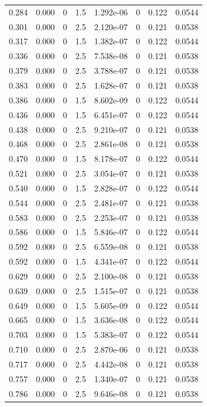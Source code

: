 \documentclass[preview]{standalone}
\begin{document}
{{\begin{tabular}{L{1.2cm}C{1.2cm} C{0.3cm}C{0.5cm} C{1.4cm}C{1.4cm} C{1.4cm}C{1.4cm}}
  0.284  &  0.000  & 0     & 1.5 &  1.292e-06  & 0  & 0.122 &  0.0544   \\ 
  0.301  &  0.000  & 0     & 2.5 &  2.120e-07  & 0  & 0.121 &  0.0538   \\ 
  0.317  &  0.000  & 0     & 1.5 &  1.382e-07  & 0  & 0.122 &  0.0544   \\ 
  0.336  &  0.000  & 0     & 2.5 &  7.538e-08  & 0  & 0.121 &  0.0538   \\ 
  0.379  &  0.000  & 0     & 2.5 &  3.788e-07  & 0  & 0.121 &  0.0538   \\ 
  0.383  &  0.000  & 0     & 2.5 &  1.628e-07  & 0  & 0.121 &  0.0538   \\ 
  0.386  &  0.000  & 0     & 1.5 &  8.602e-09  & 0  & 0.122 &  0.0544   \\ 
  0.436  &  0.000  & 0     & 1.5 &  6.451e-07  & 0  & 0.122 &  0.0544   \\ 
  0.438  &  0.000  & 0     & 2.5 &  9.210e-07  & 0  & 0.121 &  0.0538   \\ 
  0.468  &  0.000  & 0     & 2.5 &  2.861e-08  & 0  & 0.121 &  0.0538   \\ 
  0.470  &  0.000  & 0     & 1.5 &  8.178e-07  & 0  & 0.122 &  0.0544   \\ 
  0.521  &  0.000  & 0     & 2.5 &  3.054e-07  & 0  & 0.121 &  0.0538   \\ 
  0.540  &  0.000  & 0     & 1.5 &  2.828e-07  & 0  & 0.122 &  0.0544   \\ 
  0.544  &  0.000  & 0     & 2.5 &  2.481e-07  & 0  & 0.121 &  0.0538   \\ 
  0.583  &  0.000  & 0     & 2.5 &  2.253e-07  & 0  & 0.121 &  0.0538   \\ 
  0.586  &  0.000  & 0     & 1.5 &  5.846e-07  & 0  & 0.122 &  0.0544   \\ 
  0.592  &  0.000  & 0     & 2.5 &  6.559e-08  & 0  & 0.121 &  0.0538   \\ 
  0.592  &  0.000  & 0     & 1.5 &  4.341e-07  & 0  & 0.122 &  0.0544   \\ 
  0.629  &  0.000  & 0     & 2.5 &  2.100e-08  & 0  & 0.121 &  0.0538   \\ 
  0.639  &  0.000  & 0     & 2.5 &  1.515e-07  & 0  & 0.121 &  0.0538   \\ 
  0.649  &  0.000  & 0     & 1.5 &  5.605e-09  & 0  & 0.122 &  0.0544   \\ 
  0.665  &  0.000  & 0     & 1.5 &  3.636e-08  & 0  & 0.122 &  0.0544   \\ 
  0.703  &  0.000  & 0     & 1.5 &  5.383e-07  & 0  & 0.122 &  0.0544   \\ 
  0.710  &  0.000  & 0     & 2.5 &  2.870e-06  & 0  & 0.121 &  0.0538   \\ 
  0.717  &  0.000  & 0     & 2.5 &  4.442e-08  & 0  & 0.121 &  0.0538   \\ 
  0.757  &  0.000  & 0     & 2.5 &  1.340e-07  & 0  & 0.121 &  0.0538   \\ 
  0.786  &  0.000  & 0     & 2.5 &  9.646e-08  & 0  & 0.121 &  0.0538   \\ 
\hline 
\end{tabular} 

}}
\end{document}
